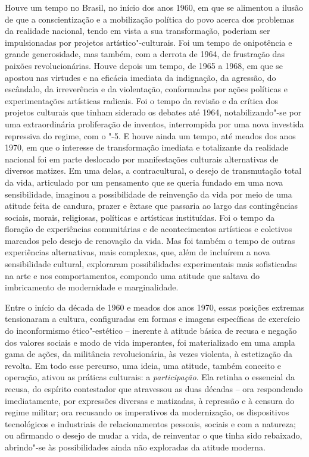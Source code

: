 \movetooddpage

Houve um tempo no Brasil, no início dos anos 1960, em que se alimentou a
ilusão de que a conscientização e a mobilização política do povo acerca
dos problemas da realidade nacional, tendo em vista a sua transformação,
poderiam ser impulsionadas por projetos artístico"-culturais. Foi um
tempo de onipotência e grande generosidade, mas também, com a derrota de
1964, de frustração das paixões revolucionárias. Houve depois um tempo,
de 1965 a 1968, em que se apostou nas virtudes e na eficácia imediata da
indignação, da agressão, do escândalo, da irreverência e da violentação,
conformadas por ações políticas e experimentações artísticas radicais.
Foi o tempo da revisão e da crítica dos projetos culturais que tinham
siderado os debates até 1964, notabilizando"-se por uma extraordinária
proliferação de inventos, interrompida por uma nova investida repressiva
do regime, com o "-5. E houve ainda um tempo, até meados dos anos 1970,
em que o interesse de transformação imediata e totalizante da realidade
nacional foi em parte deslocado por manifestações culturais alternativas
de diversos matizes. Em uma delas, a contracultural, o desejo de
transmutação total da vida, articulado por um pensamento que se queria
fundado em uma nova sensibilidade, imaginou a possibilidade de
reinvenção da vida por meio de uma atitude feita de candura, prazer e
êxtase que passaria ao largo das contingências sociais, morais,
religiosas, políticas e artísticas instituídas. Foi o tempo da floração
de experiências comunitárias e de acontecimentos artísticos e coletivos
marcados pelo desejo de renovação da vida. Mas foi também o tempo de
outras experiências alternativas, mais complexas, que, além de incluírem
a nova sensibilidade cultural, exploraram possibilidades experimentais
mais sofisticadas na arte e nos comportamentos, compondo uma atitude que
saltava do imbricamento de modernidade e marginalidade.

Entre o início da década de 1960 e meados dos anos 1970, essas posições
extremas tensionaram a cultura, configuradas em formas e imagens
específicas de exercício do inconformismo ético"-estético -- inerente à
atitude básica de recusa e negação dos valores sociais e modo de vida
imperantes, foi materializado em uma ampla gama de ações, da militância
revolucionária, às vezes violenta, à estetização da revolta. Em todo
esse percurso, uma ideia, uma atitude, também conceito e operação,
ativou as práticas culturais: a \emph{participação}. Ela retinha o
essencial da recusa, do espírito contestador que atravessou as duas
décadas -- ora respondendo imediatamente, por expressões diversas e
matizadas, à repressão e à censura do regime militar; ora recusando os
imperativos da modernização, os dispositivos tecnológicos e industriais
de relacionamentos pessoais, sociais e com a natureza; ou afirmando o
desejo de mudar a vida, de reinventar o que tinha sido rebaixado,
abrindo"-se às possibilidades ainda não exploradas da atitude moderna.

